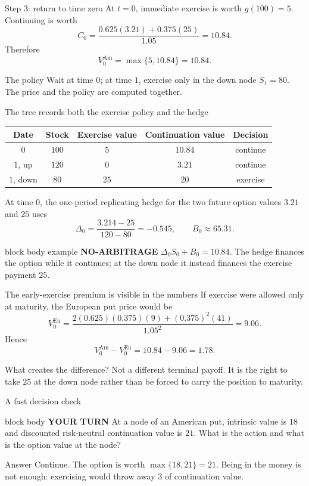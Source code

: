 \documentclass[handout,10pt,aspectratio=169]{beamer}
\newenvironment{marketbox}{\begin{beamercolorbox}[rounded=true,sep=0.7em,wd=\textwidth]{block body example}
  \textbf{\color{CourseGreen}NO-ARBITRAGE}\quad}{\end{beamercolorbox}}
\newenvironment{pausebox}{\begin{beamercolorbox}[rounded=true,sep=0.8em,wd=\textwidth]{block body}
  \textbf{\color{CourseGold}YOUR TURN}\quad}{\end{beamercolorbox}}
\begin{document}
\begin{frame}{Step 3: return to time zero}
At \(t=0\), immediate exercise is worth \(g(100)=5\). Continuing is worth
\[
C_0=\frac{0.625(3.21)+0.375(25)}{1.05}=10.84.
\]
Therefore
\[
\boxed{V_0^{\mathrm{Am}}=\max\{5,10.84\}=10.84.}
\]
\begin{block}{The policy}
Wait at time \(0\); at time \(1\), exercise only in the down node \(S_1=80\).
The price and the policy are computed together.
\end{block}
\end{frame}

\begin{frame}{The tree records both the exercise policy and the hedge}
\begin{center}
\begin{tabular}{c|c|c|c|c}
\toprule
Date & Stock & Exercise value & Continuation value & Decision\\
\midrule
\(0\) & \(100\) & \(5\) & \(10.84\) & continue\\
\(1\), up & \(120\) & \(0\) & \(3.21\) & continue\\
\(1\), down & \(80\) & \(25\) & \(20\) & exercise\\
\bottomrule
\end{tabular}
\end{center}
At time \(0\), the one-period replicating hedge for the two future option
values \(3.21\) and \(25\) uses
\[
\Delta_0=\frac{3.214-25}{120-80}=-0.545,\qquad
B_0\approx65.31.
\]
\begin{marketbox}
\(\Delta_0S_0+B_0=10.84\). The hedge finances the option while it continues;
at the down node it instead finances the exercise payment \(25\).
\end{marketbox}
\end{frame}

\begin{frame}{The early-exercise premium is visible in the numbers}
If exercise were allowed only at maturity, the European put price would be
\[
V_0^{\mathrm{Eu}}
=\frac{2(0.625)(0.375)(9)+(0.375)^2(41)}{1.05^2}
=9.06.
\]
Hence
\[
\boxed{V_0^{\mathrm{Am}}-V_0^{\mathrm{Eu}}=10.84-9.06=1.78.}
\]
\begin{alertblock}{What creates the difference?}
Not a different terminal payoff. It is the right to take \(25\) at the down
node rather than be forced to carry the position to maturity.
\end{alertblock}
\end{frame}

\begin{frame}{A fast decision check}
\begin{pausebox}
At a node of an American put, intrinsic value is \(18\) and discounted
risk-neutral continuation value is \(21\). What is the action and what is the
option value at the node?
\end{pausebox}

\begin{exampleblock}{Answer}
Continue. The option is worth \(\max\{18,21\}=21\). Being in the money is
not enough: exercising would throw away \(3\) of continuation value.
\end{exampleblock}
\end{frame}
\end{document}
